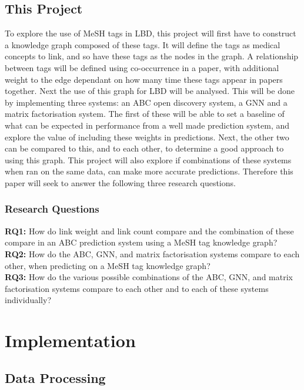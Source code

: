 \documentclass{l4proj}
\begin{document}
\section{This Project}

To explore the use of MeSH tags in LBD, this project will first have to construct a knowledge graph composed of these tags. It will define the tags as medical concepts to link, and so have these tags as the nodes in the graph. A relationship between tags will be defined using co-occurrence in a paper, with additional weight to the edge dependant on how many time these tags appear in papers together. Next the use of this graph for LBD will be analysed. This will be done by implementing three systems: an ABC open discovery system, a GNN and a matrix factorisation system. The first of these will be able to set a baseline of what can be expected in performance from a well made prediction system, and explore the value of including these weights in predictions. Next, the other two can be compared to this, and to each other, to determine a good approach to using this graph. This project will also explore if combinations of these systems when ran on the same data, can make more accurate predictions. Therefore this paper will seek to answer the following three research questions. \\

\subsection{Research Questions}

\textbf{RQ1:} How do link weight and link count compare and the combination of these compare in an ABC prediction system using a MeSH tag knowledge graph? \\

\textbf{RQ2:} How do the ABC, GNN, and matrix factorisation systems compare to each other, when predicting on a MeSH tag knowledge graph? \\

\textbf{RQ3:} How do the various possible combinations of the ABC, GNN, and matrix factorisation systems compare to each other and to each of these systems individually? \\

\chapter{Implementation}

\section{Data Processing}
\end{document}
